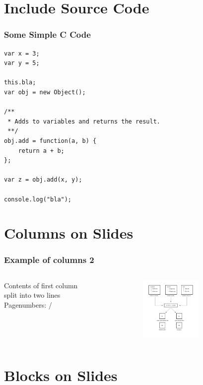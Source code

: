 \section{Include Source Code}

\begin{frame}[fragile]
\frametitle{Some Simple C Code}

\begin{lstlisting}[caption=Some JavaScript code]
var x = 3;
var y = 5;

this.bla;
var obj = new Object();

/**
 * Adds to variables and returns the result.
 **/
obj.add = function(a, b) {
	return a + b;
};

var z = obj.add(x, y);

console.log("bla");

\end{lstlisting}
\end{frame}

\section{Columns on Slides}

\begin{frame}
	\frametitle{Example of columns 2}
	\begin{columns}[T] %
	\begin{column}[T]{5cm} %
	Contents of first column \\ split into two lines \\
	Pagenumbers: \insertframenumber/\inserttotalframenumber
	\end{column}
	\begin{column}[T]{5cm} %
          		\includegraphics[height=3cm]{./assets/overview.png}
	\end{column}
	\end{columns}
\end{frame}


\section{Blocks on Slides}



